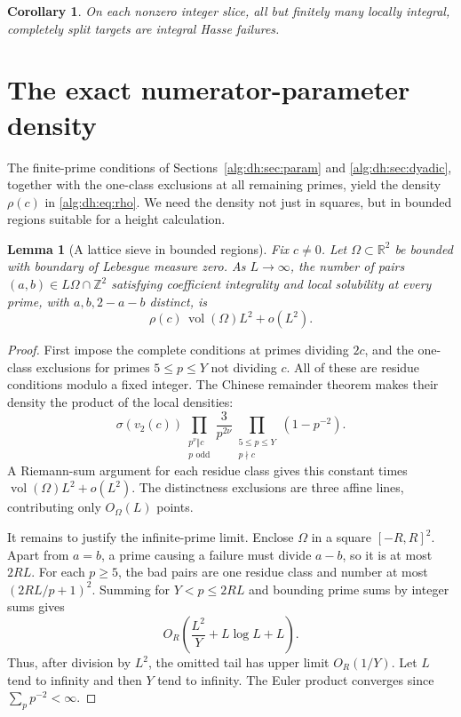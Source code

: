 \documentclass[11pt]{article}
\numberwithin{equation}{section}
\theoremstyle{plain}
\theoremstyle{plain}
\newtheorem{lemma}[lemma]{Lemma}
\theoremstyle{plain}
\newtheorem{corollary}[corollary]{Corollary}
\theoremstyle{definition}
\theoremstyle{definition}
\theoremstyle{definition}
\theoremstyle{remark}
\newcommand{\Z}{\mathbb Z}\newcommand{\Q}{\mathbb Q}
\newcommand{\R}{\mathbb R}\newcommand{\C}{\mathbb C}
\newcommand{\vol}{\operatorname{vol}}
\begin{document}
\begin{corollary}
On each nonzero integer slice, all but finitely many locally integral,
completely split targets are integral Hasse failures.
\end{corollary}

\section{The exact numerator-parameter density}\label{alg:dh:sec:density}
The finite-prime conditions of Sections~\ref{alg:dh:sec:param} and
\ref{alg:dh:sec:dyadic}, together with the one-class exclusions at all remaining
primes, yield the density $\rho(c)$ in \eqref{alg:dh:eq:rho}.
We need the density not just in squares, but in bounded regions suitable
for a height calculation.

\begin{lemma}[A lattice sieve in bounded regions]\label{alg:dh:lem:sieve}
Fix $c\ne0$. Let $\Omega\subset\R^2$ be bounded with boundary of
Lebesgue measure zero. As $L\to\infty$, the number of pairs
$(a,b)\in L\Omega\cap\Z^2$ satisfying coefficient integrality and local
solubility at every prime, with $a,b,2-a-b$ distinct, is
\begin{equation}\label{alg:dh:eq:sieve-asymptotic}
 \rho(c)\,\vol(\Omega)L^2+o(L^2).
\end{equation}
\end{lemma}
\begin{proof}
First impose the complete conditions at primes dividing $2c$, and the
one-class exclusions for primes $5\le p\le Y$ not dividing $c$.
All of these are residue conditions modulo a fixed integer. The Chinese
remainder theorem makes their density the product of the local densities:
\[
 \sigma(v_2(c))
 \prod_{\substack{p^\nu\Vert c\\p\text{ odd}}}\frac3{p^{2\nu}}
 \prod_{\substack{5\le p\le Y\\p\nmid c}}(1-p^{-2}).
\]
A Riemann-sum argument for each residue class gives this constant times
$\vol(\Omega)L^2+o(L^2)$. The distinctness exclusions are three affine
lines, contributing only $O_\Omega(L)$ points.

It remains to justify the infinite-prime limit. Enclose $\Omega$ in a
square $[-R,R]^2$. Apart from $a=b$, a prime causing a failure must divide
$a-b$, so it is at most $2RL$. For each $p\ge5$, the bad pairs are one
residue class and number at most $(2RL/p+1)^2$. Summing for $Y<p\le2RL$
and bounding prime sums by integer sums gives
\begin{equation}\label{alg:dh:eq:large-prime-tail}
 O_R\left(\frac{L^2}{Y}+L\log L+L\right).
\end{equation}
Thus, after division by $L^2$, the omitted tail has upper limit
$O_R(1/Y)$. Let $L$ tend to infinity and then $Y$ tend to infinity.
The Euler product converges since $\sum_p p^{-2}<\infty$.
\end{proof}
\end{document}
